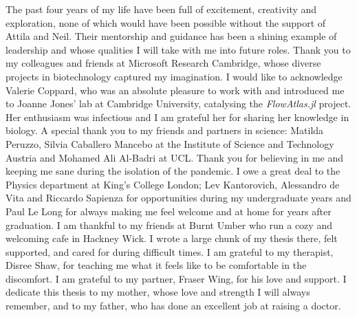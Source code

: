 \begin{acknowledgements}
\vspace{-3em}
    The past four years of my life have been full of excitement, creativity and exploration, none of which would have been possible without the support of Attila and Neil. Their mentorship and guidance has been a shining example of leadership and whose qualities I will take with me into future roles. Thank you to my colleagues and friends at Microsoft Research Cambridge, whose diverse projects in biotechnology captured my imagination. I would like to acknowledge Valerie Coppard, who was an absolute pleasure to work with and introduced me to Joanne Jones' lab at Cambridge University, catalysing the \emph{FlowAtlas.jl} project. Her enthusiasm was infectious and I am grateful her for sharing her knowledge in biology. A special thank you to my friends and partners in science: Matilda Peruzzo, Silvia Caballero Mancebo at the Institute of Science and Technology Austria and Mohamed Ali Al-Badri at UCL. Thank you for believing in me and keeping me sane during the isolation of the pandemic. I owe a great deal to the Physics department at King's College London; Lev Kantorovich, Alessandro de Vita and Riccardo Sapienza for opportunities during my undergraduate years and Paul Le Long for always making me feel welcome and at home for years after graduation. I am thankful to my friends at Burnt Umber who run a cozy and welcoming cafe in Hackney Wick. I wrote a large chunk of my thesis there, felt supported, and cared for during difficult times. I am grateful to my therapist, Disree Shaw, for teaching me what it feels like to be comfortable in the discomfort. I am grateful to my partner, Fraser Wing, for his love and support. I dedicate this thesis to my mother, whose love and strength I will always remember, and to my father, who has done an excellent job at raising a doctor.

\end{acknowledgements}


\setcounter{tocdepth}{2} 

\tableofcontents
\listoffigures